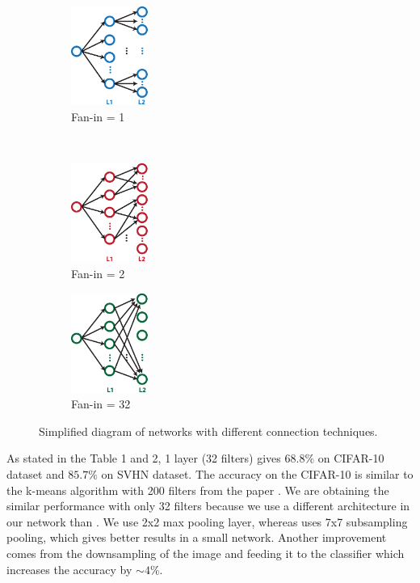 \documentclass{article} %
\begin{document}
\begin{figure}
        \centering
         \label{fig-secondconnex}
        \begin{subfigure}[b]{0.3\textwidth}
                \centering
                \includegraphics[width=1.0in]{fig-diagram-fanin1.eps}
                \caption{Fan-in = 1}
        \end{subfigure}%
        ~%
          \begin{subfigure}[b]{0.3\textwidth}
                \centering
                \includegraphics[width=1.0in]{fig-diagram-fanin2.eps}
                \caption{Fan-in = 2}
        \end{subfigure}%
        \begin{subfigure}[b]{0.3\textwidth}
                \centering
                \includegraphics[width=1.0in]{fig-diagram-faninall.eps}
                \caption{Fan-in = 32}
        \end{subfigure}
        \caption{Simplified diagram of networks with different connection techniques.}
\end{figure}


As stated in the Table 1 and 2, 1 layer (32 filters) gives $68.8\%$ on CIFAR-10 dataset and $85.7\%$ on SVHN dataset.
The accuracy on the CIFAR-10 is similar to the k-means algorithm with 200 filters from the paper \cite{coates_analysis_2011}.
We are obtaining the similar performance with only 32 filters because we use a different architecture in our network than \cite{coates_analysis_2011}.
We use 2x2 max pooling layer, whereas \cite{coates_analysis_2011} uses 7x7 subsampling pooling, which gives better results in a small network.
Another improvement comes from the downsampling of the image and feeding it to the classifier which increases the accuracy by  $\sim 4\%$. 
\end{document}
